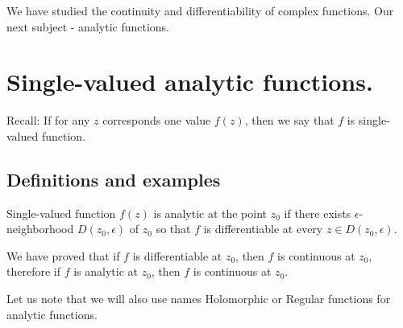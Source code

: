 
% 
% 
% 
% 
% 
% 
% 
% 
% 
% 
% 

\graphicspath{{./input/graphs/note04/}}


% 



We have studied the continuity and differentiability of complex functions. Our next subject - analytic functions.

\section{Single-valued analytic functions.}

Recall: If for any $z$ corresponds one value $f(z)$, then we say that $f$ is single-valued function.

\subsection{Definitions and examples}

\begin{definition}\label{definition:7.1} Single-valued function $f(z)$ is analytic at the 
    point $z_0$ if there exists $\epsilon$-neighborhood $D(z_0, \epsilon)$ of $z_0$ so that $f$ is differentiable at every $z \in D(z_0, \epsilon)$.
\end{definition}
We have proved that if $f$ is differentiable at $z_0$, then $f$ is continuous at $z_0$, therefore if $f$ is analytic at $z_0$, then $f$ is continuous at $z_0$.

Let us note that we will also use names Holomorphic or Regular functions for analytic functions.

